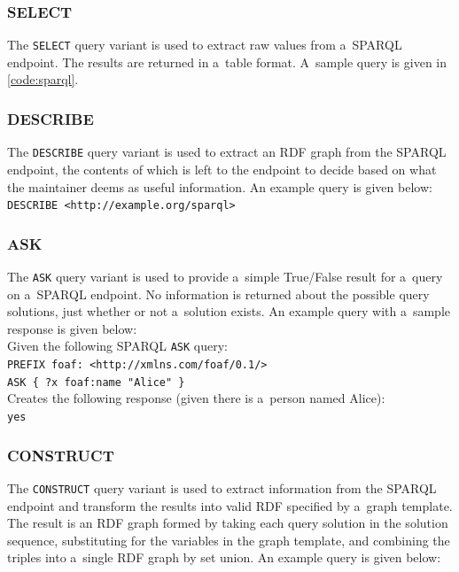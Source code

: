 \subsubsection{SELECT}
The \texttt{SELECT} query variant is used to extract raw values from a~SPARQL endpoint.
The results are returned in a~table format. A~sample query is given in \autoref{code:sparql}.

\subsubsection{DESCRIBE}
The \texttt{DESCRIBE} query variant is used to extract an RDF graph from the SPARQL endpoint,
the contents of which is left to the endpoint to decide
based on what the maintainer deems as useful information. An example query is given below:\\

\texttt{DESCRIBE <http://example.org/sparql>}

\subsubsection{ASK}
The \texttt{ASK} query variant is used to provide a~simple True/False result
for a~query on a~SPARQL endpoint.
No information is returned about the possible query solutions,
just whether or not a~solution exists.
An example query with a~sample response is given below:\\

\noindent Given the following SPARQL \texttt{ASK} query:\\

\texttt{PREFIX foaf: <http://xmlns.com/foaf/0.1/>\\
\indent ASK \{ ?x foaf:name  "Alice" \}}\\

\noindent Creates the following response (given there is a~person named Alice):\\

\texttt{yes}

\subsubsection{CONSTRUCT}
The \texttt{CONSTRUCT} query variant is used to extract information from the SPARQL endpoint
and transform the results into valid RDF specified by a~graph template.
The result is an RDF graph formed by taking each query solution in the solution sequence,
substituting for the variables in the graph template,
and combining the triples into a~single RDF graph by set union.
An example query is given below:\\

